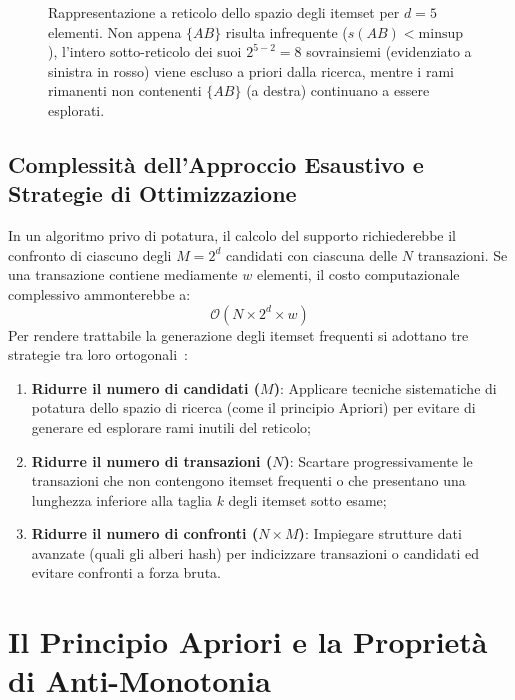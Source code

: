 \begin{figure}[H]
{\begin{tikzpicture}
\end{tikzpicture}%
}
\caption{Rappresentazione a reticolo dello spazio degli itemset per $d=5$ elementi. Non appena $\{AB\}$ risulta infrequente ($s(AB) < \mathrm{minsup}$), l'intero sotto-reticolo dei suoi $2^{5-2}=8$ sovrainsiemi (evidenziato a sinistra in rosso) viene escluso a priori dalla ricerca, mentre i rami rimanenti non contenenti $\{AB\}$ (a destra) continuano a essere esplorati.}
\label{fig:dm-itemset-lattice-pruning}
\end{figure}

\FloatBarrier
\subsection{Complessità dell'Approccio Esaustivo e Strategie di Ottimizzazione}
In un algoritmo privo di potatura, il calcolo del supporto richiederebbe il confronto di ciascuno degli $M = 2^d$ candidati con ciascuna delle $N$ transazioni. Se una transazione contiene mediamente $w$ elementi, il costo computazionale complessivo ammonterebbe a:
\begin{equation}
\label{eq:dm-exhaustive-search-complexity}
\mathcal{O}\left(N \times 2^d \times w\right)
\end{equation}
Per rendere trattabile la generazione degli itemset frequenti si adottano tre strategie tra loro ortogonali~\cite{tan2018}:
\begin{enumerate}
    \item \textbf{Ridurre il numero di candidati ($M$)}: Applicare tecniche sistematiche di potatura dello spazio di ricerca (come il principio Apriori) per evitare di generare ed esplorare rami inutili del reticolo;
    \item \textbf{Ridurre il numero di transazioni ($N$)}: Scartare progressivamente le transazioni che non contengono itemset frequenti o che presentano una lunghezza inferiore alla taglia $k$ degli itemset sotto esame;
    \item \textbf{Ridurre il numero di confronti ($N \times M$)}: Impiegare strutture dati avanzate (quali gli alberi hash) per indicizzare transazioni o candidati ed evitare confronti a forza bruta.
\end{enumerate}

\FloatBarrier
\section{Il Principio Apriori e la Proprietà di Anti-Monotonia}
\label{sec:dm-apriori-principle}

